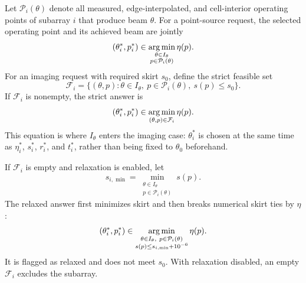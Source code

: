 \documentclass[11pt]{article}
\begin{document}
Let $\mathcal P_i(\theta)$ denote all measured, edge-interpolated, and
cell-interior operating points of subarray $i$ that produce beam $\theta$.
For a point-source request, the selected operating point and its achieved beam
are jointly
\begin{equation}
 (\theta_i^*,p_i^*)\in
 \mathop{\rm arg\,min}_{\substack{\theta\in I_\theta\\
                                  p\in\mathcal P_i(\theta)}}\eta(p).
 \label{eq:point-source-choice}
\end{equation}
For an imaging request with required skirt $s_0$, define the strict feasible
set
\begin{equation}
 \mathcal F_i=\{(\theta,p):\theta\in I_\theta,
               \ p\in\mathcal P_i(\theta),\ s(p)\le s_0\}.
 \label{eq:strict-set}
\end{equation}
If $\mathcal F_i$ is nonempty, the strict answer is
\begin{equation}
 (\theta_i^*,p_i^*)\in
 \mathop{\rm arg\,min}_{(\theta,p)\in\mathcal F_i}\eta(p).
 \label{eq:strict-choice}
\end{equation}
This equation is where $I_\theta$ enters the imaging case: $\theta_i^*$ is
chosen at the same time as $\eta_i^*$, $s_i^*$, $r_i^*$, and $t_i^*$, rather
than being fixed to $\theta_0$ beforehand.

If $\mathcal F_i$ is empty and relaxation is enabled, let
\begin{equation}
 s_{i,\min}=\min_{\substack{\theta\in I_\theta\\
                            p\in\mathcal P_i(\theta)}}s(p).
\end{equation}
The relaxed answer first minimizes skirt and then breaks numerical skirt ties
by $\eta$:
\begin{equation}
 (\theta_i^*,p_i^*)\in
 \mathop{\rm arg\,min}_{\substack{\theta\in I_\theta,
                                  \ p\in\mathcal P_i(\theta)\\
                                  s(p)\le s_{i,\min}+10^{-6}}}\eta(p).
 \label{eq:relaxed-choice}
\end{equation}
It is flagged as relaxed and does not meet $s_0$.  With relaxation disabled,
an empty $\mathcal F_i$ excludes the subarray.
\end{document}
